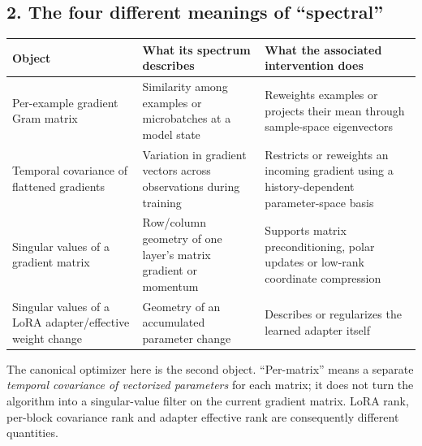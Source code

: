 \documentclass[
  british,
  10pt,
  a4paper,
]{article}
\newcounter{none} %
\begin{document}
\subsection{2. The four different meanings of
``spectral''}\label{synthesis--the-four-different-meanings-of-spectral}

{\def\LTcaptype{none} %
\begin{longtable}[]{@{}
  >{\raggedright\arraybackslash}p{}
  >{\raggedright\arraybackslash}p{}
  >{\raggedright\arraybackslash}p{}@{}}
\toprule\noalign{}
\begin{minipage}[b]{\linewidth}\raggedright
Object
\end{minipage} & \begin{minipage}[b]{\linewidth}\raggedright
What its spectrum describes
\end{minipage} & \begin{minipage}[b]{\linewidth}\raggedright
What the associated intervention does
\end{minipage} \\
\midrule\noalign{}
\endhead
\bottomrule\noalign{}
\endlastfoot
Per-\allowbreak{}example gradient Gram matrix & Similarity among
examples or microbatches at a model state & Reweights examples or
projects their mean through sample-\allowbreak{}space eigenvectors \\
Temporal covariance of flattened gradients & Variation in gradient
vectors across observations during training & Restricts or reweights an
incoming gradient using a history-\allowbreak{}dependent
parameter-\allowbreak{}space basis \\
Singular values of a gradient matrix & Row/column geometry of one
layer's matrix gradient or momentum & Supports matrix
precondition\allowbreak{}ing,\allowbreak{} polar updates or low-rank
coordinate compression \\
Singular values of a LoRA adapter/\allowbreak{}effective weight change &
Geometry of an accumulated parameter change & Describes or regularizes
the learned adapter itself \\
\end{longtable}
}

The canonical optimizer here is the second object.
“Per-\allowbreak{}matrix” means a separate \emph{temporal covariance of
vectorized parameters} for each matrix; it does not turn the algorithm
into a singular-\allowbreak{}value filter on the current gradient
matrix. LoRA rank, per-block covariance rank and adapter effective rank
are consequently different quantities.\allowbreak{}
\end{document}
